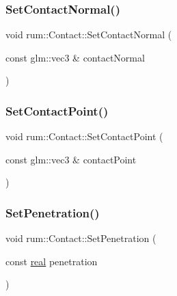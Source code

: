 \mbox{\label{classrum_1_1_contact_a0e0cd538aab86185bd22e6660e225db2}} 
\subsubsection{\texorpdfstring{Set\+Contact\+Normal()}{SetContactNormal()}}
{\footnotesize\ttfamily void rum\+::\+Contact\+::\+Set\+Contact\+Normal (\begin{DoxyParamCaption}\item[{const glm\+::vec3 \&}]{contact\+Normal }\end{DoxyParamCaption})}

\mbox{\label{classrum_1_1_contact_a64ba0fca39f090fd7f211cb1a7585578}} 
\subsubsection{\texorpdfstring{Set\+Contact\+Point()}{SetContactPoint()}}
{\footnotesize\ttfamily void rum\+::\+Contact\+::\+Set\+Contact\+Point (\begin{DoxyParamCaption}\item[{const glm\+::vec3 \&}]{contact\+Point }\end{DoxyParamCaption})}

\mbox{\label{classrum_1_1_contact_a713b7b8eb8adcf50a616ab9e1b391ecc}} 
\subsubsection{\texorpdfstring{Set\+Penetration()}{SetPenetration()}}
{\footnotesize\ttfamily void rum\+::\+Contact\+::\+Set\+Penetration (\begin{DoxyParamCaption}\item[{const \hyperlink{namespacerum_a7e8cca23573d5eaead0f138cbaa4862c}{real}}]{penetration }\end{DoxyParamCaption})}

